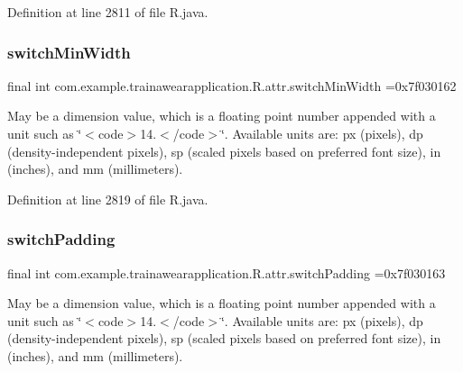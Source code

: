 Definition at line 2811 of file R.\+java.

\mbox{\label{classcom_1_1example_1_1trainawearapplication_1_1_r_1_1attr_afa519be5736b8263e258b0ecc502a542}} 
\subsubsection{\texorpdfstring{switchMinWidth}{switchMinWidth}}
{\footnotesize\ttfamily final int com.\+example.\+trainawearapplication.\+R.\+attr.\+switch\+Min\+Width =0x7f030162\hspace{0.3cm}{\ttfamily [static]}}

May be a dimension value, which is a floating point number appended with a unit such as \char`\"{}$<$code$>$14.\+5sp$<$/code$>$\char`\"{}. Available units are\+: px (pixels), dp (density-\/independent pixels), sp (scaled pixels based on preferred font size), in (inches), and mm (millimeters). 

Definition at line 2819 of file R.\+java.

\mbox{\label{classcom_1_1example_1_1trainawearapplication_1_1_r_1_1attr_a33bedc5cd18ee85091753d00925cb870}} 
\subsubsection{\texorpdfstring{switchPadding}{switchPadding}}
{\footnotesize\ttfamily final int com.\+example.\+trainawearapplication.\+R.\+attr.\+switch\+Padding =0x7f030163\hspace{0.3cm}{\ttfamily [static]}}

May be a dimension value, which is a floating point number appended with a unit such as \char`\"{}$<$code$>$14.\+5sp$<$/code$>$\char`\"{}. Available units are\+: px (pixels), dp (density-\/independent pixels), sp (scaled pixels based on preferred font size), in (inches), and mm (millimeters). 

